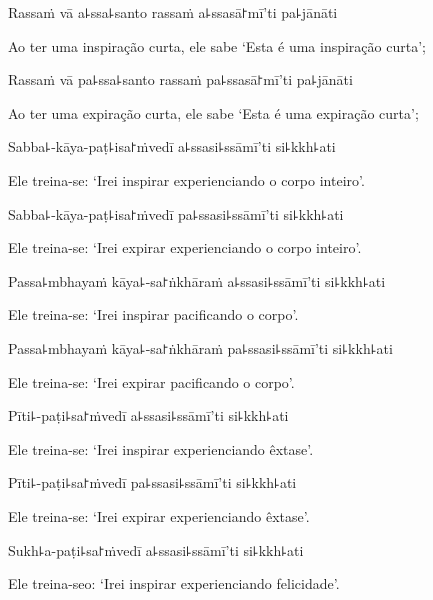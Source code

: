 Rassaṁ vā a꜕ssa꜕santo rassaṁ a꜕ssasā꜓mī'ti pa꜕jānāti

\begin{english}
  Ao ter uma inspiração curta, ele sabe `Esta é uma inspiração curta';
\end{english}

Rassaṁ vā pa꜕ssa꜕santo rassaṁ pa꜕ssasā꜓mī'ti pa꜕jānāti

\begin{english}
  Ao ter uma expiração curta, ele sabe `Esta é uma expiração curta';
\end{english}

Sabba꜕-kāya-paṭ꜕isa꜓ṁvedī a꜕ssasi꜕ssāmī'ti si꜕kkh꜕ati

\begin{english}
  Ele treina-se: `Irei inspirar experienciando o corpo inteiro'.
\end{english}

Sabba꜕-kāya-paṭ꜕isa꜓ṁvedī pa꜕ssasi꜕ssāmī'ti si꜕kkh꜕ati

\begin{english}
  Ele treina-se: `Irei expirar experienciando o corpo inteiro'.
\end{english}

Passa꜕mbhayaṁ kāya꜕-sa꜓ṅkhāraṁ a꜕ssasi꜕ssāmī'ti si꜕kkh꜕ati

\begin{english}
  Ele treina-se: `Irei inspirar pacificando o corpo'.
\end{english}

Passa꜕mbhayaṁ kāya꜕-sa꜓ṅkhāraṁ pa꜕ssasi꜕ssāmī'ti si꜕kkh꜕ati

\begin{english}
  Ele treina-se: `Irei expirar pacificando o corpo'.
\end{english}

Pīti꜕-paṭi꜕sa꜓ṁvedī a꜕ssasi꜕ssāmī'ti si꜕kkh꜕ati

\begin{english}
  Ele treina-se: `Irei inspirar experienciando êxtase'.
\end{english}

Pīti꜕-paṭi꜕sa꜓ṁvedī pa꜕ssasi꜕ssāmī'ti si꜕kkh꜕ati

\begin{english}
  Ele treina-se: `Irei expirar experienciando êxtase'.
\end{english}

Sukh꜕a-paṭi꜕sa꜓ṁvedī a꜕ssasi꜕ssāmī'ti si꜕kkh꜕ati

\begin{english}
  Ele treina-seo: `Irei inspirar experienciando felicidade'.
\end{english}

